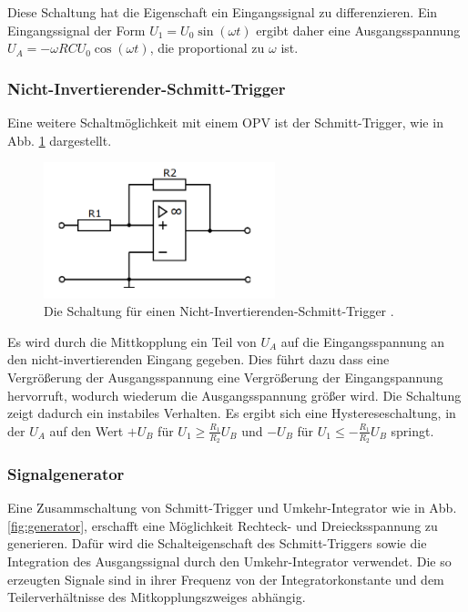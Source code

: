     Diese Schaltung hat die Eigenschaft ein Eingangssignal zu differenzieren.
    Ein Eingangssignal der Form $U_1 = U_0\sin(\omega t)$ ergibt daher eine Ausgangsspannung $U_A = -\omega RCU_0\cos(\omega t)$, die proportional zu $\omega$ ist.

    \subsubsection{Nicht-Invertierender-Schmitt-Trigger}

    Eine weitere Schaltmöglichkeit mit einem OPV ist der Schmitt-Trigger, wie in Abb. \ref{fig:schmittimacschmitt} dargestellt.

    \begin{figure}
    \centering
    \includegraphics[width=0.6\textwidth]{Pics/schmitt.png}
    \caption{Die Schaltung für einen Nicht-Invertierenden-Schmitt-Trigger \cite{anleitungneu}.}
    \label{fig:schmittimacschmitt}
    \end{figure}

    Es wird durch die Mittkopplung ein Teil von $U_A$ auf die Eingangsspannung an den nicht-invertierenden Eingang gegeben. Dies f\"uhrt dazu dass eine Vergr\"o{\ss}erung der Ausgangsspannung eine Vergrößerung der
    Eingangspannung hervorruft, wodurch wiederum die Ausgangsspannung gr\"o{\ss}er wird.
    Die Schaltung zeigt dadurch ein instabiles Verhalten. Es ergibt sich eine Hystereseschaltung, in der $U_A$ auf den Wert $+U_B$ für $U_1\geq\frac{R_1}{R_2}U_B$ und $-U_B$ für $U_1\leq-\frac{R_1}{R_2}U_B$ springt.

    \subsubsection{Signalgenerator}

    Eine Zusammschaltung von Schmitt-Trigger und Umkehr-Integrator wie in Abb. \ref{fig:generator}, erschafft eine Möglichkeit Rechteck- und Dreiecksspannung zu generieren. Dafür wird die
    Schalteigenschaft des Schmitt-Triggers sowie die Integration des Ausgangssignal durch den Umkehr-Integrator verwendet. Die so erzeugten Signale sind in ihrer Frequenz von der Integratorkonstante und
    dem Teilerverhältnisse des Mitkopplungszweiges abhängig.

